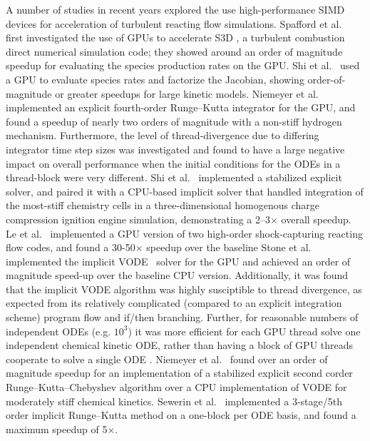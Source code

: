 \documentclass[preprint,12pt]{elsarticle}
\begin{document}
A number of studies in recent years explored the use high-performance SIMD devices for acceleration of turbulent reacting flow simulations.
Spafford et al.~\cite{Spafford:2010aa} first investigated the use of GPUs to accelerate S3D \cite{CHEN:2009s3d}, a turbulent combustion direct numerical simulation code; they showed around an order of magnitude speedup for evaluating the species production rates on the GPU.
Shi et al.~\cite{Shi:2011aa} used a GPU to evaluate species rates and factorize the Jacobian, showing order-of-magnitude or greater speedups for large kinetic models.
Niemeyer et al.~\cite{Niemeyer:2011aa} implemented an explicit fourth-order Runge--Kutta integrator for the GPU, and found a speedup of nearly two orders of magnitude with a non-stiff hydrogen mechanism.
Furthermore, the level of thread-divergence due to differing integrator time step sizes was investigated and found to have a large negative impact on overall performance when the initial conditions for the ODEs in a thread-block were very different.
Shi et al.~\cite{Shi:2012aa} implemented a stabilized explicit solver, and paired it with a CPU-based implicit solver that handled integration of the most-stiff chemistry cells in a three-dimensional homogenous charge compression ignition engine simulation, demonstrating a 2--3$\times$ overall speedup.
Le et al.~\cite{Le2013596} implemented a GPU version of two high-order shock-capturing reacting flow codes, and found a 30-50$\times$ speedup over the baseline 
Stone et al.~\cite{Stone:2013aa} implemented the implicit VODE~\cite{brown1989vode} solver for the GPU and achieved an order of magnitude speed-up over the baseline CPU version.
Additionally, it was found that the implicit VODE algorithm was highly susciptible to thread divergence, as expected from its relatively complicated (compared to an explicit integration scheme) program flow and if/then branching.
Further, for reasonable numbers of independent ODEs (e.g. $\mathcal{10^3}$) it was more efficient for each GPU thread solve one independent chemical kinetic ODE, rather than having a block of GPU threads cooperate to solve a single ODE \cite{Stone:2013aa}.
Niemeyer et al.~\cite{Niemeyer:2014aa} found over an order of magnitude speedup for an implementation of a stabilized explicit second corder Runge--Kutta--Chebyshev algorithm over a CPU implementation of VODE for moderately stiff chemical kinetics.
Sewerin et al.~\cite{Sewerin20151375} implemented a 3-stage/5th order implicit Runge--Kutta method on a one-block per ODE basis, and found a maximum speedup of 5$\times$.
\end{document}
